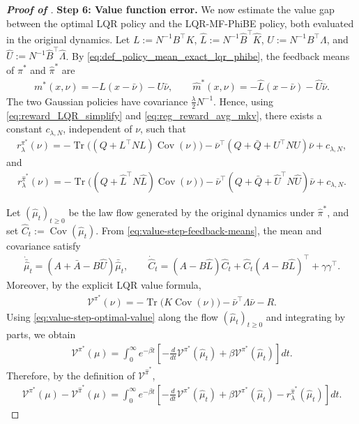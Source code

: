 \documentclass[a4paper, 10pt, english, reqno]{amsart}
\begin{document}
\begin{proof}[\textbf{Proof of }]
\medskip
\noindent
\textbf{Step 6: Value function error.}
We now estimate the value gap between the optimal LQR policy and the LQR-MF-PhiBE policy, both evaluated in the original dynamics. Let $L:=N^{-1}B^\top K$, $\hat L:=N^{-1}\hat B^\top\hat K$, $U:=N^{-1}B^\top\Lambda$, and $\hat U:=N^{-1}\hat B^\top\hat\Lambda$. By \eqref{eq:def_policy_mean_exact_lqr_phibe}, the feedback means of $\pi^*$ and $\hat\pi^*$ are
\begin{align}
\label{eq:value-step-feedback-means}
m^*(x,\nu)=-L(x-\bar\nu)-U\bar\nu,
\qquad
\hat m^*(x,\nu)=-\hat L(x-\bar\nu)-\hat U\bar\nu.
\end{align}
The two Gaussian policies have covariance $\frac{\lambda}{2}N^{-1}$. Hence, using \eqref{eq:reward_LQR_simplify} and \eqref{eq:reg_reward_avg_mkv}, there exists a constant $c_{\lambda,N}$, independent of $\nu$, such that
\begin{align}
\label{eq:value-step-reward-pistar}
r_\lambda^{\pi^*}(\nu)
=
-\operatorname{Tr}\bigl((Q+L^\top NL)\operatorname{Cov}(\nu)\bigr)
-\bar\nu^\top(Q+\bar Q+U^\top NU)\bar\nu
+c_{\lambda,N},
\end{align}
and
\begin{align}
\label{eq:value-step-reward-pihat}
r_\lambda^{\hat\pi^*}(\nu)
=
-\operatorname{Tr}\bigl((Q+\hat L^\top N\hat L)\operatorname{Cov}(\nu)\bigr)
-\bar\nu^\top(Q+\bar Q+\hat U^\top N\hat U)\bar\nu
+c_{\lambda,N}.
\end{align}

Let $(\hat\mu_t)_{t\ge0}$ be the law flow generated by the original dynamics under $\hat\pi^*$, and set $\hat C_t:=\operatorname{Cov}(\hat\mu_t)$. From \eqref{eq:value-step-feedback-means}, the mean and covariance satisfy
\begin{align}
\label{eq:value-step-flow-pihat}
\dot{\bar{\hat\mu}}_t=(A+\bar A-B\hat U)\bar{\hat\mu}_t,
\qquad
\dot{\hat C}_t=(A-B\hat L)\hat C_t+\hat C_t(A-B\hat L)^\top+\gamma\gamma^\top .
\end{align}
Moreover, by the explicit LQR value formula,
\begin{align}
\label{eq:value-step-optimal-value}
\mathcal V^{\pi^*}(\nu)
=
-\operatorname{Tr}\bigl(K\operatorname{Cov}(\nu)\bigr)
-\bar\nu^\top\Lambda\bar\nu
-R.
\end{align}
Using \eqref{eq:value-step-optimal-value} along the flow $(\hat\mu_t)_{t\ge0}$ and integrating by parts, we obtain
\begin{align}
\label{eq:value-step-integration-by-parts}
\mathcal V^{\pi^*}(\mu)
=
\int_0^\infty e^{-\beta t}
\left[
-\frac{d}{dt}\mathcal V^{\pi^*}(\hat\mu_t)
+\beta\mathcal V^{\pi^*}(\hat\mu_t)
\right]dt .
\end{align}
Therefore, by the definition of $\mathcal V^{\hat\pi^*}$,
\begin{align}
\label{eq:value-step-gap-before-integrand}
\mathcal V^{\pi^*}(\mu)-\mathcal V^{\hat\pi^*}(\mu)
=
\int_0^\infty e^{-\beta t}
\left[
-\frac{d}{dt}\mathcal V^{\pi^*}(\hat\mu_t)
+\beta\mathcal V^{\pi^*}(\hat\mu_t)
-r_\lambda^{\hat\pi^*}(\hat\mu_t)
\right]dt .
\end{align}


\end{proof}
\end{document}
